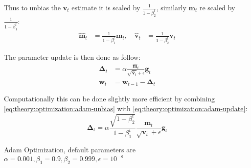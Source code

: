 Thus to unbias the $\mathbf{v}_t$ estimate it is scaled by $\frac{1}{1 - \beta_2^t}$, similarly $\mathbf{m}_t$ re scaled by $\frac{1}{1 - \beta_1^t}$:
\begin{equation}
\begin{aligned}
\hat{\mathbf{m}}_t &= \frac{1}{1 - \beta_1^t} \mathbf{m}_t, \quad \hat{\mathbf{v}}_t &= \frac{1}{1 - \beta_2^t} \mathbf{v}_t
\end{aligned}
\label{eq:theory:optimization:adam-unbias}
\end{equation}

The parameter update is then done as follow:
\begin{equation}
\begin{aligned}
{\boldsymbol\Delta}_t &= \alpha \frac{\hat{\mathbf{m}}_t}{\sqrt{\hat{\mathbf{v}}_t} + \epsilon} \mathbf{g}_t \\
\mathbf{w}_t &= \mathbf{w}_{t-1} - {\boldsymbol\Delta}_t
\end{aligned}
\label{eq:theory:optimization:adam-update}
\end{equation}

Computationally this can be done slightly more efficient by combining \eqref{eq:theory:optimization:adam-unbias} with \eqref{eq:theory:optimization:adam-update}:
\begin{equation}
{\boldsymbol\Delta}_t = \alpha \frac{\sqrt{1 - \beta_2^t}}{1 - \beta_1^t} \frac{\mathbf{m}_t}{\sqrt{\mathbf{v}_t} + \epsilon} \mathbf{g}_t
\end{equation}


\begin{algorithm}[H]
  \caption{Adam Optimization, default parameters are $\alpha=0.001, \beta_1=0.9, \beta_2=0.999, \epsilon=10^{-8}$}
  \begin{algorithmic}[1]
      \Repeat
      \State {}
    \EndFunction
  \end{algorithmic}
\end{algorithm}

